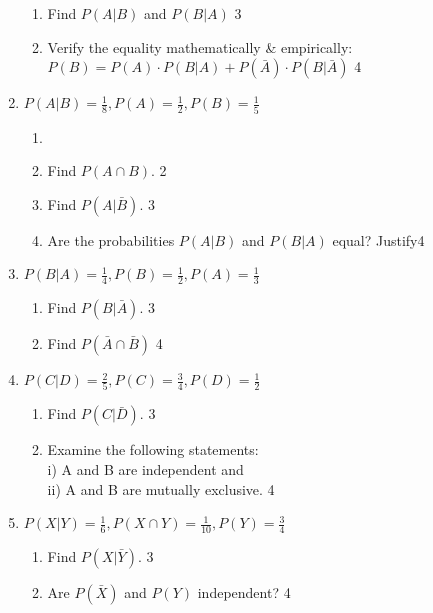 \documentclass[a4paper,oneside, margin=1.4in]{book}
\begin{document}
\begin{enumerate}
  \begin{enumerate}
    \item  
	Find $P(A \vert B)$ and $P(B \vert A)$ \hfill 3
    \item
	Verify the equality mathematically \& empirically: $P(B) = P(A) \cdot P(B \vert A) + P(\bar A) \cdot P(B \vert \bar A)$ \hfill 4
  \end{enumerate}
  
   \item
  \textbf{$P(A\vert B) = \frac 1 8, P(A) = \frac 12, P(B) = \frac 15$}
 
  \begin{enumerate}
    \item
    \item
    	Find $P(A\cap B)$.  \hfill 2
    \item
    	Find $P(A\vert \bar B)$. \hfill 3
     \item
     	Are the probabilities $P(A\vert B)$ and $P(B\vert A)$ equal? Justify\hfill 4
  \end{enumerate}
  
  \item \textbf{\( P(B \vert A) = \frac{1}{4}, P(B) = \frac{1}{2}, P(A) = \frac{1}{3} \)}

\begin{enumerate}
    \item Find \( P(B \vert \bar{A}) \). \hfill 3
    \item Find $P(\bar A \cap \bar B)$ \hfill 4
\end{enumerate}

\item \textbf{\( P(C \vert D) = \frac{2}{5}, P(C) = \frac{3}{4}, P(D) = \frac{1}{2} \)}

\begin{enumerate}
    \item Find \( P(C \vert \bar{D}) \). \hfill 3
    \item Examine the following statements: \\ i) A and B are independent and \\
    ii) A and B are mutually exclusive. \hfill 4
\end{enumerate}

\item \textbf{\( P(X \vert Y) = \frac{1}{6}, P(X \cap Y) = \frac{1}{10}, P(Y) = \frac{3}{4} \)}

\begin{enumerate}
    \item Find \( P(X \vert \bar{Y}) \). \hfill 3
    \item Are $P(\bar X)$ and $P(Y)$ independent? \hfill 4
\end{enumerate}


\end{enumerate}
\end{document}
